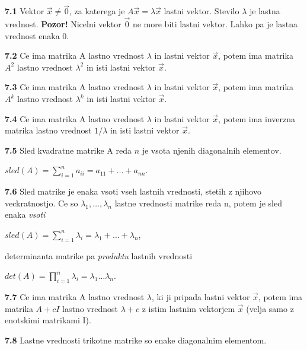 \documentclass{article}
\begin{document}
\begin{multicols}{2}
\textbf{7.1} Vektor $\vec{x} \neq \vec{0}$, za katerega je $A\vec{x} = \lambda \vec{x}$ lastni vektor. Stevilo
$\lambda$ je lastna vrednost.
\textbf{Pozor!} Nicelni vektor $\vec{0}$ ne more biti lastni vektor. Lahko pa je lastna vrednost enaka 0.

\textbf{7.2} Ce ima matrika A lastno vrednost $\lambda$ in lastni vektor $\vec{x}$, potem ima matrika
$A^{2}$ lastno vrednost $\lambda^{2}$ in isti lastni vektor $\vec{x}$.

\textbf{7.3} Ce ima matrika A lastno vrednost $\lambda$ in lastni vektor $\vec{x}$, potem ima
matrika $A^{k}$ lastno vrednost $\lambda^{k}$ in isti lastni vektor $\vec{x}$.

\textbf{7.4} Ce ima matrika A lastno vrednost $\lambda$ in lastni vektor $\vec{x}$, potem ima
inverzna matrika lastno vrednost $1 / \lambda$ in isti lastni vektor $\vec{x}$.

\textbf{7.5} Sled kvadratne matrike A reda $n$ je vsota njenih diagonalnih elementov.
\begin{center}
	\begin{math}
		sled(A) =
		\sum_{i=1}^{n} a_{ii} =
		a_{11} + \dots + a_{nn}
	\end{math}.
\end{center}

\textbf{7.6} Sled matrike je enaka vsoti vseh lastnih vrednosti, stetih z njihovo veckratnostjo.
Ce so $\lambda_{1}, \dots, \lambda_{n}$ lastne vrednosti matrike reda n, potem je sled enaka \textit{vsoti}
\begin{center}
	\begin{math}
		sled(A) =
		\sum_{i=1}^{n} \lambda_{i} =
		\lambda_{1} + \dots + \lambda_{n}
	\end{math},
\end{center}
determinanta matrike pa \textit{produktu} lastnih vrednosti
\begin{center}
	\begin{math}
		det(A) =
		\prod_{i=1}^{n} \lambda_{i} =
		\lambda_{1} \dots  \lambda_{n}
	\end{math}.
\end{center}

\textbf{7.7} Ce ima matrika A lastno vrednost $\lambda$, ki ji pripada lastni vektor $\vec{x}$,
potem ima matrika $A + cI$ lastno vrednost $\lambda + c$ z istim lastnim vektorjem $\vec{x}$ (velja samo z
enotskimi matrikami I).

\textbf{7.8} Lastne vrednosti trikotne matrike so enake diagonalnim elementom.


\end{multicols}
\end{document}
